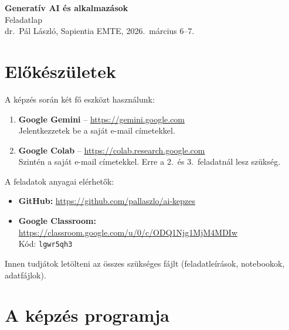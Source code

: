 \documentclass[11pt,a4paper]{article}
\begin{document}
\thispagestyle{empty}
\begin{center}
  {\LARGE\bfseries Generatív AI és alkalmazások}\\[5pt]
  {\normalsize Feladatlap}\\[1pt]
  {\small\color{medgray} dr.\ Pál László, Sapientia EMTE, 2026.\ március 6--7.}
\end{center}

\section{Előkészületek}

A képzés során két fő eszközt használunk:

\begin{enumerate}[leftmargin=1.5em]
  \item \textbf{Google Gemini} -- \url{https://gemini.google.com}\\
    Jelentkezzetek be a saját e-mail címetekkel.
  \item \textbf{Google Colab} -- \url{https://colab.research.google.com}\\
    Szintén a saját e-mail címetekkel. Erre a 2.\ és 3.\ feladatnál lesz szükség.
\end{enumerate}

\noindent A feladatok anyagai elérhetők:
\begin{itemize}[leftmargin=1.5em]
  \item \textbf{GitHub:} \url{https://github.com/pallaszlo/ai-kepzes}
  \item \textbf{Google Classroom:} \url{https://classroom.google.com/u/0/c/ODQ1Njg1MjM4MDIw}\\
    Kód: \texttt{lgwr5qh3}
\end{itemize}

\noindent Innen tudjátok letölteni az összes szükséges fájlt (feladatleírások, notebookok, adatfájlok).

\section{A képzés programja}

\end{document}
